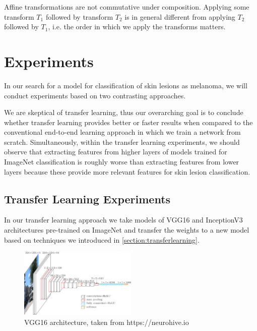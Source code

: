 Affine transformations are not commutative under composition. Applying some transform $T_1$ followed by transform $T_2$ is in general different from applying $T_2$ followed by $T_1$, i.e. the order in which we apply the transforms matters.

\section{Experiments}
\label{section:experiments}

In our search for a model for classification of skin lesions as melanoma, we will conduct experiments based on two contrasting approaches.

We are skeptical of transfer learning, thus our overarching goal is to conclude whether transfer learning provides better or faster results when compared to the conventional end-to-end learning approach in which we train a network from scratch. Simultaneously, within the transfer learning experiments, we should observe that extracting features from higher layers of models trained for ImageNet\cite{imagenet} classification is roughly worse than extracting features from lower layers because these provide more relevant features for skin lesion classification.

\subsection{Transfer Learning Experiments}
\label{subsection:transferlearningexperiments}

In our transfer learning approach we take models of VGG16 \cite{vgg16} and InceptionV3\cite{inceptionv3} architectures pre-trained on ImageNet \cite{imagenet} and transfer the weights to a new model based on techniques we introduced in \ref{section:transferlearning}.

\begin{figure}[h]
    \centering
    \includegraphics[width=0.5\textwidth]{figs/vgg16.jpg}
    \caption{VGG16 architecture, taken from https://neurohive.io}
    \label{fig:vgg16}
\end{figure}


